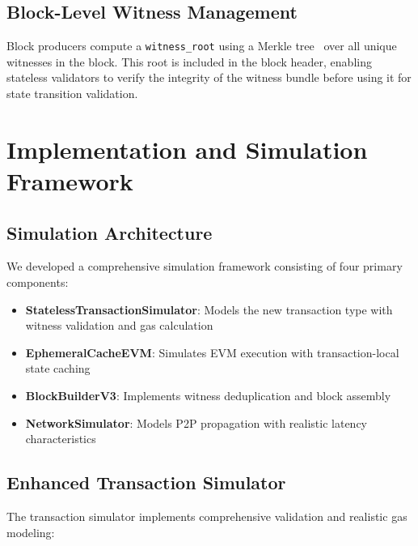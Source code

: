 \documentclass{article}
\begin{document}
\subsection{Block-Level Witness Management}

Block producers compute a \texttt{witness\_root} using a Merkle tree~\cite{merkle1987digital} over all unique witnesses in the block. This root is included in the block header, enabling stateless validators to verify the integrity of the witness bundle before using it for state transition validation.

\section{Implementation and Simulation Framework}

\subsection{Simulation Architecture}

We developed a comprehensive simulation framework consisting of four primary components:

\begin{itemize}
\item \textbf{StatelessTransactionSimulator}: Models the new transaction type with witness validation and gas calculation
\item \textbf{EphemeralCacheEVM}: Simulates EVM execution with transaction-local state caching
\item \textbf{BlockBuilderV3}: Implements witness deduplication and block assembly
\item \textbf{NetworkSimulator}: Models P2P propagation with realistic latency characteristics
\end{itemize}

\subsection{Enhanced Transaction Simulator}

The transaction simulator implements comprehensive validation and realistic gas modeling:
\end{document}
